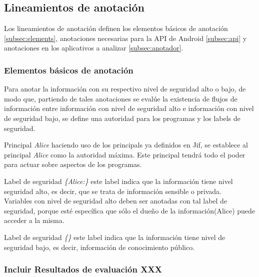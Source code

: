 \subsection{Lineamientos de anotación}
Los lineamientos de anotación definen los elementos básicos de anotación
\ref{subsec:elements}, anotaciones necesarias para la API de Android
\ref{subsec:api} y anotaciones en los aplicativos a analizar \ref{subsec:anotador}.

\subsubsection{Elementos básicos de anotación}
Para anotar la información con su respectivo nivel de seguridad alto o bajo, de
modo que, partiendo de tales anotaciones se evalúe la existencia de flujos de
información entre información con nivel de seguridad alto e información con
nivel de seguridad bajo, se define una autoridad para los programas y los labels
de seguridad.\newline 

Principal \emph{Alice}\newline
haciendo uso de los principals ya definidos en Jif, se establece al principal
\emph{Alice} como la autoridad máxima. Este principal tendrá todo el poder para
actuar sobre aspectos de los programas.

Label de seguridad \emph{\{Alice:\}}\newline
este label indica que la información tiene nivel seguridad alto, es decir, que
se trata de información sensible o privada.\\
Variables con nivel de seguridad alto deben ser anotadas con tal label de
seguridad, porque esté específica que sólo el dueño de la información(Alice)
puede acceder a la misma. 

Label de seguridad \emph{\{\}}\newline
este label indica que la información tiene nivel de seguridad bajo, es decir,
información de conocimiento público.


\subsubsection{Incluir Resultados de evaluación XXX}





















